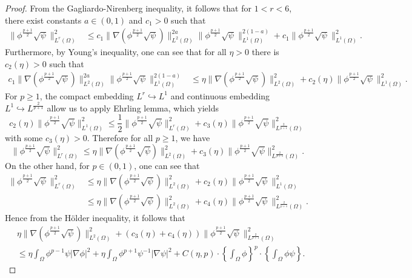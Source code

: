 \documentclass[12pt]{article}
\theoremstyle{plain}
\theoremstyle{definition}
\numberwithin{equation}{section}
\begin{document}
\begin{proof}
    From the Gagliardo-Nirenberg inequality, it follows that for $1<r<6$, there exist constants
    $a\in(0,1)$  and $c_1>0$ such that
    \begin{align*}
      \|\phi^{\frac{p+1}{2}}\sqrt{\psi}\|^2_{L^{r}(\Omega)}&\leq c_1\|\nabla
      (\phi^{\frac{p+1}{2}}\sqrt{\psi})\|^{2a}_{L^{2}(\Omega)}\|\phi^{\frac{p+1}{2}}\sqrt{\psi}\|^{2(1-a)}_{L^{1}(\Omega)}
      +c_1\|\phi^{\frac{p+1}{2}}\sqrt{\psi}\|_{L^{1}(\Omega)}^2.
          \end{align*}
    Furthermore,  by Young's inequality,  one can see that  for all $\eta >0$ there is $ c_2(\eta)>0$
    such that
    \begin{align}\label{2.39}
      c_1\|\nabla
      (\phi^{\frac{p+1}{2}}\sqrt{\psi})\|^{2a}_{L^{2}(\Omega)}\|\phi^{\frac{p+1}{2}}\sqrt{\psi}\|^{2(1-a)}_{L^{1}(\Omega)}&\leq \eta \|\nabla (\phi^{\frac{p+1}{2}}\sqrt{\psi})\|_{L^{2}(\Omega)}^2+c_2(\eta)\|\phi^{\frac{p+1}{2}}\sqrt{\psi}\|_{L^{1}(\Omega)}^2.
    \end{align}
     For $p\geq 1$, the compact embedding $L^{r}\hookrightarrow L^{1} $ and continuous embedding $L^{1}\hookrightarrow
    L^{\frac{2}{p+1}}$ allow us to apply Ehrling lemma, which yields
    $$c_2(\eta)\|\phi^{\frac{p+1}{2}}\sqrt{\psi}\|_{L^{1}(\Omega)}^2\leq
    \frac{1}{2}\|\phi^{\frac{p+1}{2}}\sqrt{\psi}\|^2_{L^{r}(\Omega)}+c_3(\eta)\|\phi^{\frac{p+1}{2}}\sqrt{\psi}\|^2_{L^{\frac 2{p+1}}(\Omega)}$$
   with some $c_3(\eta)>0$.  Therefore for all  $p\geq 1$, we have
    $$\|\phi^{\frac{p+1}{2}}\sqrt{\psi}\|^2_{L^{r}(\Omega)}\leq \eta \|\nabla
    (\phi^{\frac{p+1}{2}}\sqrt{\psi})\|_{L^{2}(\Omega)}^2+c_3(\eta)\|\phi^{\frac{p+1}{2}}\sqrt{\psi}\|^2_{L^{\frac{2}{p+1}}(\Omega)}.$$
   On the other hand, for $p\in(0,1)$, one can see  that
    \begin{align*}
      \|\phi^{\frac{p+1}{2}}\sqrt{\psi}\|^2_{L^{r}(\Omega)}
      &\leq \eta \|\nabla
      (\phi^{\frac{p+1}{2}}\sqrt{\psi})\|_{L^{2}(\Omega)}^2+c_2(\eta)\|\phi^{\frac{p+1}{2}}\sqrt{\psi}\|_{L^{1}(\Omega)}^2\nonumber\\
      &\leq \eta \|\nabla
      (\phi^{\frac{p+1}{2}}\sqrt{\psi})\|_{L^{2}(\Omega)}^2+c_4(\eta)\|\phi^{\frac{p+1}{2}}\sqrt{\psi}\|_{L^{\frac2{p+1}}(\Omega)}^2.
    \end{align*}
    Hence from  the H\"{o}lder inequality,  it follows that
    \begin{align}\label{2.40}
    &\eta \|\nabla
    (\phi^{\frac{p+1}{2}}\sqrt{\psi})\|_{L^{2}(\Omega)}^2+ (c_3(\eta)+ c_4(\eta))\|\phi^{\frac{p+1}2}\sqrt{\psi}\|_{L^{\frac2{p+1}}(\Omega)}^2\nonumber\\
    &\leq \eta \int_{\Omega}\phi^{p-1}\psi|\nabla \phi|^2+\eta \int_{\Omega}\phi^{p+1}\psi^{-1}|\nabla \psi|^2+C(\eta,p)\cdot
    \left\{\int_{\Omega}\phi\right\}^{p}\cdot\left\{\int_{\Omega}\phi\psi\right\}.
\end{align}
\end{proof}
\end{document}
